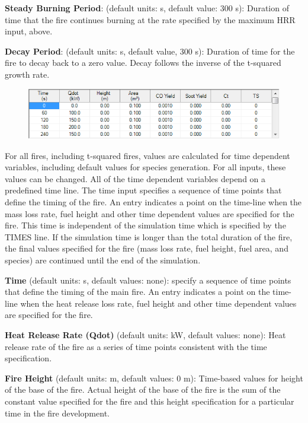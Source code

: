 \textbf{Steady Burning Period}: (default units: s, default value: 300 s): Duration of time that the fire continues burning at the rate specified by the maximum HRR input, above.

\textbf{Decay Period}: (default units: s, default value, 300 s): Duration of time for the fire to decay back to a zero value.  Decay follows the inverse of the t-squared growth rate.

\begin{figure}[h!]
\begin{center}
\includegraphics[width=6.219in]{FIGURES/Input_File/Fire_Spreadsheet}
\end{center}
\end{figure}

For all fires, including t-squared fires, values are calculated for time dependent variables, including default values for species generation. For all inputs, these values can be changed. All of the time dependent variables depend on a predefined time line. The time input specifies a sequence of time points that define the timing of the fire.  An entry indicates a point on the time-line when the mass loss rate, fuel height and other time dependent values are specified for the fire.  This time is independent of the simulation time which is specified by the TIMES line. If the simulation time is longer than the total duration of the fire, the final values specified for the fire (mass loss rate, fuel height, fuel area, and species) are continued until the end of the simulation.

\textbf{Time} (default units: s, default values: none): specify a sequence of time points that define the timing of the main fire.  An entry indicates a point on the time-line when the heat release loss rate, fuel height and other time dependent values are specified for the fire.

\textbf{Heat Release Rate (Qdot)} (default units: kW, default values: none): Heat release rate of the fire as a series of time points consistent with the time specification.

\textbf{Fire Height} (default units: m, default values: 0 m): Time-based values for height of the base of the fire.  Actual height of the base of the fire is the sum of the constant value specified for the fire and this height specification for a particular time in the fire development.

